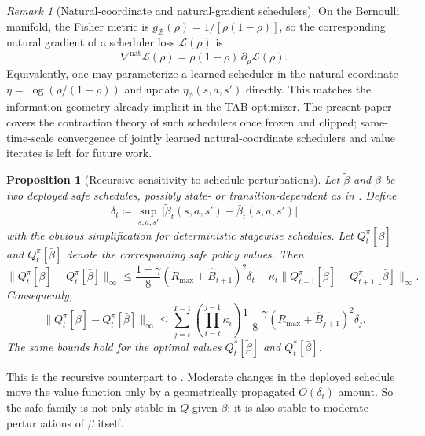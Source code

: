 \documentclass{article}
\newtheorem{proposition}[proposition]{Proposition}
\theoremstyle{remark}
\newtheorem{remark}[remark]{Remark}
\newcommand{\defeq}{\coloneqq}
\newcommand{\cB}{\mathcal{B}}
\newcommand{\Bhat}{\widehat B}
\begin{document}
\begin{remark}[Natural-coordinate and natural-gradient schedulers]
\label{rem:natural-gradient-scheduler}
On the Bernoulli manifold, the Fisher metric is $g_{\cB}(\rho)=1/[\rho(1-\rho)]$, so the corresponding natural gradient of a scheduler loss $\mathcal L(\rho)$ is
\[
\nabla^{\mathrm{nat}} \mathcal L(\rho)=\rho(1-\rho)\,\partial_\rho \mathcal L(\rho).
\]
Equivalently, one may parameterize a learned scheduler in the natural coordinate $\eta=\log(\rho/(1-\rho))$ and update $\eta_\phi(s,a,s')$ directly. This matches the information geometry already implicit in the TAB optimizer. The present paper covers the contraction theory of such schedulers once frozen and clipped; same-time-scale convergence of jointly learned natural-coordinate schedulers and value iterates is left for future work.
\end{remark}

\begin{proposition}[Recursive sensitivity to schedule perturbations]
\label{prop:schedule-sensitivity}
Let $\widetilde\beta$ and $\bar\beta$ be two deployed safe schedules, possibly state- or transition-dependent as in . Define
\[
\delta_t \defeq \sup_{s,a,s'} \bigl|\widetilde\beta_t(s,a,s')-\bar\beta_t(s,a,s')\bigr|
\]
with the obvious simplification for deterministic stagewise schedules. Let $Q_t^\pi[\widetilde\beta]$ and $Q_t^\pi[\bar\beta]$ denote the corresponding safe policy values. Then
\begin{equation}
\|Q_t^\pi[\widetilde\beta]-Q_t^\pi[\bar\beta]\|_\infty
\le
\frac{1+\gamma}{8}(R_{\max}+\Bhat_{t+1})^2\delta_t
+
\kappa_t\|Q_{t+1}^\pi[\widetilde\beta]-Q_{t+1}^\pi[\bar\beta]\|_\infty.
\label{eq:schedule-sensitivity-recursion}
\end{equation}
Consequently,
\begin{equation}
\|Q_t^\pi[\widetilde\beta]-Q_t^\pi[\bar\beta]\|_\infty
\le
\sum_{j=t}^{T-1}\left(\prod_{i=t}^{j-1}\kappa_i\right)
\frac{1+\gamma}{8}(R_{\max}+\Bhat_{j+1})^2\delta_j.
\label{eq:schedule-sensitivity-unrolled}
\end{equation}
The same bounds hold for the optimal values $Q_t^*[\widetilde\beta]$ and $Q_t^*[\bar\beta]$.
\end{proposition}

This is the recursive counterpart to . Moderate changes in the deployed schedule move the value function only by a geometrically propagated $O(\delta_t)$ amount. So the safe family is not only stable in $Q$ given $\beta$; it is also stable to moderate perturbations of $\beta$ itself.
\end{document}
